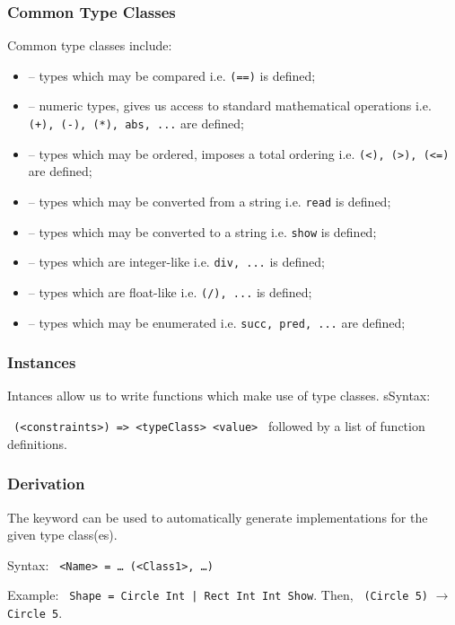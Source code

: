 \subsubsection{Common Type Classes}
Common type classes include:
\begin{itemize}
  \item \texttt{} -- types which may be compared i.e. \texttt{(==)} is defined;
  \item \texttt{} -- numeric types, gives us access to standard mathematical operations i.e. \texttt{(+), (-), (*), abs, ...} are defined;
  \item \texttt{} -- types which may be ordered, imposes a total ordering i.e. \texttt{(<), (>), (<=)} are defined;
  \item \texttt{} -- types which may be converted from a string i.e. \texttt{read} is defined;
  \item \texttt{} -- types which may be converted to a string i.e. \texttt{show} is defined;
  \item \texttt{} -- types which are integer-like i.e. \texttt{div, ...} is defined;
  \item \texttt{} -- types which are float-like i.e. \texttt{(/), ...} is defined;
  \item \texttt{} -- types which may be enumerated i.e. \texttt{succ, pred, ...} are defined;
\end{itemize}

\subsubsection{Instances}
Intances allow us to write functions which make use of type classes. sSyntax:

\texttt{ (<constraints>) => <typeClass> <value> } followed by a list of function definitions.

\subsubsection{Derivation}
The \texttt{} keyword can be used to automatically generate implementations for the given type class(es).

Syntax: \texttt{ <Name> = \ldots {} (<Class1>, \ldots)}

Example: \texttt{ Shape = Circle Int | Rect Int Int  Show}. Then, \texttt{ (Circle 5)} $\rightarrow$ \texttt{Circle 5}.

